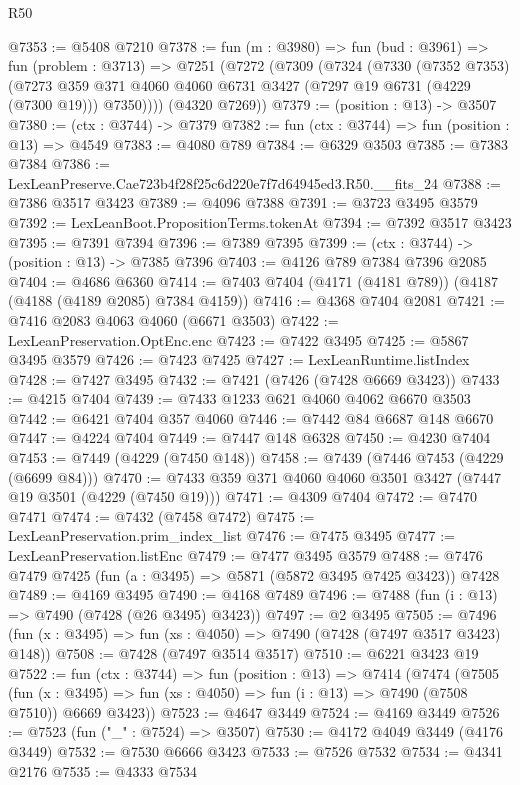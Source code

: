 \begin{lexlean}{R50}
\begin{coremodule}
@7353 := @5408 @7210
@7378 := fun (m : @3980) =>
  fun (bud : @3961) =>
  fun (problem : @3713) =>
  @7251
    (@7272
      (@7309
        (@7324
          (@7330
            (@7352 @7353)
            (@7273 @359 @371 @4060 @4060 @6731 @3427 (@7297 @19 @6731 (@4229 (@7300 @19))) @7350))))
      (@4320 @7269))
@7379 := (position : @13) -> @3507
@7380 := (ctx : @3744) -> @7379
@7382 := fun (ctx : @3744) => fun (position : @13) => @4549
@7383 := @4080 @789
@7384 := @6329 @3503
@7385 := @7383 @7384
@7386 := LexLeanPreserve.Cae723b4f28f25c6d220e7f7d64945ed3.R50.__fits_24
@7388 := @7386 @3517 @3423
@7389 := @4096 @7388
@7391 := @3723 @3495 @3579
@7392 := LexLeanBoot.PropositionTerms.tokenAt
@7394 := @7392 @3517 @3423
@7395 := @7391 @7394
@7396 := @7389 @7395
@7399 := (ctx : @3744) -> (position : @13) -> @7385 @7396
@7403 := @4126 @789 @7384 @7396 @2085
@7404 := @4686 @6360
@7414 := @7403 @7404 (@4171 (@4181 @789)) (@4187 (@4188 (@4189 @2085) @7384 @4159))
@7416 := @4368 @7404 @2081
@7421 := @7416 @2083 @4063 @4060 (@6671 @3503)
@7422 := LexLeanPreservation.OptEnc.enc
@7423 := @7422 @3495
@7425 := @5867 @3495 @3579
@7426 := @7423 @7425
@7427 := LexLeanRuntime.listIndex
@7428 := @7427 @3495
@7432 := @7421 (@7426 (@7428 @6669 @3423))
@7433 := @4215 @7404
@7439 := @7433 @1233 @621 @4060 @4062 @6670 @3503
@7442 := @6421 @7404 @357 @4060
@7446 := @7442 @84 @6687 @148 @6670
@7447 := @4224 @7404
@7449 := @7447 @148 @6328
@7450 := @4230 @7404
@7453 := @7449 (@4229 (@7450 @148))
@7458 := @7439 (@7446 @7453 (@4229 (@6699 @84)))
@7470 := @7433 @359 @371 @4060 @4060 @3501 @3427 (@7447 @19 @3501 (@4229 (@7450 @19)))
@7471 := @4309 @7404
@7472 := @7470 @7471
@7474 := @7432 (@7458 @7472)
@7475 := LexLeanPreservation.prim_index_list
@7476 := @7475 @3495
@7477 := LexLeanPreservation.listEnc
@7479 := @7477 @3495 @3579
@7488 := @7476 @7479 @7425 (fun (a : @3495) => @5871 (@5872 @3495 @7425 @3423)) @7428
@7489 := @4169 @3495
@7490 := @4168 @7489
@7496 := @7488 (fun (i : @13) => @7490 (@7428 (@26 @3495) @3423))
@7497 := @2 @3495
@7505 := @7496 (fun (x : @3495) => fun (xs : @4050) => @7490 (@7428 (@7497 @3517 @3423) @148))
@7508 := @7428 (@7497 @3514 @3517)
@7510 := @6221 @3423 @19
@7522 := fun (ctx : @3744) =>
  fun (position : @13) =>
  @7414
    (@7474
      (@7505
        (fun (x : @3495) => fun (xs : @4050) => fun (i : @13) => @7490 (@7508 @7510))
        @6669
        @3423))
@7523 := @4647 @3449
@7524 := @4169 @3449
@7526 := @7523 (fun ("_" : @7524) => @3507)
@7530 := @4172 @4049 @3449 (@4176 @3449)
@7532 := @7530 @6666 @3423
@7533 := @7526 @7532
@7534 := @4341 @2176
@7535 := @4333 @7534

\end{coremodule}
\end{lexlean}
